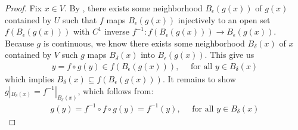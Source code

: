 \documentclass{report}
\begin{document}
\begin{proof}
Fix $x \in V$. By , there exists some neighborhood $B_\epsilon (g(x))$ of $g(x)$ contained by $U$ such that $f$ maps $B_\epsilon (g(x))$ injectively to an open set $f(B_\epsilon (g(x)))$ with $C^1$ inverse  $f^{-1}:f(B_\epsilon (g(x))) \rightarrow B_\epsilon (g(x))$.\\ 


Because $g$ is continuous, we know there exists some neighborhood $B_\delta(x)$ of $x$ contained by $V$ such $g$ maps $B_\delta (x)$ into $B_\epsilon (g(x))$. This give us  
\begin{align*}
y=f\circ g(y) \in f(B_\epsilon (g(x))),\quad \text{ for all }y \in B_{\delta}(x)
\end{align*}
which implies $B_\delta(x)\subseteq f(B_{\epsilon}(g(x)))$. It remains to show $g |_{B_\delta(x)}=f^{-1}|_{B_\delta(x)}$, which follows from: 
\begin{align*}
g(y)= f^{-1}\circ f \circ g (y)=f^{-1}(y),\quad \text{ for all }y \in B_\delta (x)
\end{align*}
\end{proof}
\end{document}
